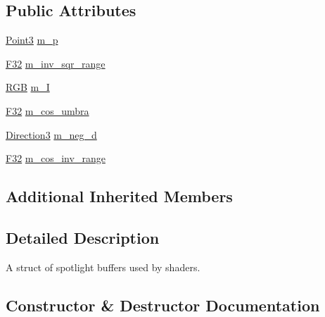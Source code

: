 \subsection*{Public Attributes}
\begin{DoxyCompactItemize}
\item 
\hyperlink{structmage_1_1_point3}{Point3} \hyperlink{structmage_1_1_spot_light_buffer_a6cb32b6089b90aa937df99bb794884e3}{m\+\_\+p}
\item 
\hyperlink{namespacemage_aa97e833b45f06d60a0a9c4fc22ae02c0}{F32} \hyperlink{structmage_1_1_spot_light_buffer_ab4039d0e1761aba882126c8fd34f309c}{m\+\_\+inv\+\_\+sqr\+\_\+range}
\item 
\hyperlink{structmage_1_1_r_g_b}{R\+GB} \hyperlink{structmage_1_1_spot_light_buffer_a1a119e91bb6ab012b8b9453d62fd8231}{m\+\_\+I}
\item 
\hyperlink{namespacemage_aa97e833b45f06d60a0a9c4fc22ae02c0}{F32} \hyperlink{structmage_1_1_spot_light_buffer_a7f12f0a2f82b99253e4ae9aff259b3ed}{m\+\_\+cos\+\_\+umbra}
\item 
\hyperlink{structmage_1_1_direction3}{Direction3} \hyperlink{structmage_1_1_spot_light_buffer_ae0baddd8256464e3cdf91a766f9bf143}{m\+\_\+neg\+\_\+d}
\item 
\hyperlink{namespacemage_aa97e833b45f06d60a0a9c4fc22ae02c0}{F32} \hyperlink{structmage_1_1_spot_light_buffer_a8d2f3b3ba07a93aaf20de1a59124b9a3}{m\+\_\+cos\+\_\+inv\+\_\+range}
\end{DoxyCompactItemize}
\subsection*{Additional Inherited Members}


\subsection{Detailed Description}
A struct of spotlight buffers used by shaders. 

\subsection{Constructor \& Destructor Documentation}
\hypertarget{structmage_1_1_spot_light_buffer_a862141be0a9dfe1fd3117141924650d5}{}\label{structmage_1_1_spot_light_buffer_a862141be0a9dfe1fd3117141924650d5} 
